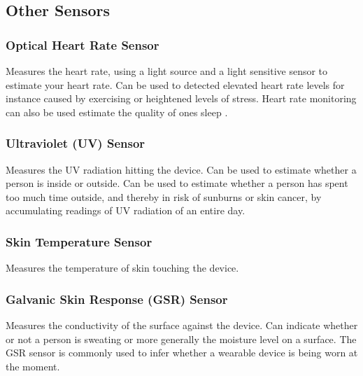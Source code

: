 \subsection{Other Sensors}

\subsubsection{Optical Heart Rate Sensor}
Measures the heart rate, using a light source and a light sensitive sensor to estimate your heart rate. Can be used to detected elevated heart rate levels for instance caused by exercising or heightened levels of stress. Heart rate monitoring can also be used estimate the quality of ones sleep \parencite{guardian_fitness_tracker_rem_sleep}. 

\subsubsection{Ultraviolet (UV) Sensor}
Measures the UV radiation hitting the device. Can be used to estimate whether a person is inside or outside. Can be used to estimate whether a person has spent too much time outside, and thereby in risk of sunburns or skin cancer, by accumulating readings of UV radiation of an entire day.   

\subsubsection{Skin Temperature Sensor}
Measures the temperature of skin touching the device.

\subsubsection{Galvanic Skin Response (GSR) Sensor}
Measures the conductivity of the surface against the device. Can indicate whether or not a person is sweating or more generally the moisture level on a surface. The GSR sensor is commonly used to infer whether a wearable device is being worn at the moment. 
